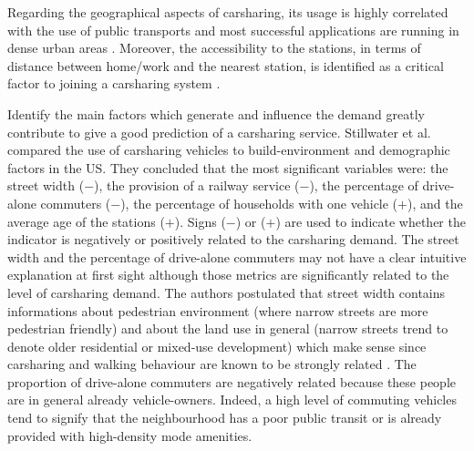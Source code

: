 \begin{bibunit}[ieeetr]
\bigskip
Regarding the geographical aspects of carsharing, its usage is highly correlated with the use of public transports and most successful applications are running in dense urban areas \cite{cervero_city_2003, millard_ball_car_sharing_2005, burkhardt_who_2006}.
Moreover, the accessibility to the stations, in terms of distance between home/work and the nearest station, is identified as a critical factor to joining a carsharing system \cite{zheng_carsharing_2009, costain_synopsis_2012, efthymiou_which_2012}.


\medskip
Identify the main factors which generate and influence the demand greatly contribute to give a good prediction of a carsharing service.
Stillwater et al. \cite{stillwater_carsharing_2009} compared the use of carsharing vehicles to build-environment and demographic factors in the US.
They concluded that the most significant variables were: the street width ($-$), the provision of a railway service ($-$), the percentage of drive-alone commuters ($-$), 
the percentage of households with one vehicle ($+$), and the average age of the stations ($+$).
Signs ($-$) or ($+$) are used to indicate whether the indicator is negatively or positively related to the carsharing demand.
The street width and the percentage of drive-alone commuters may not have a clear intuitive explanation at first sight although those metrics are significantly related to the level of carsharing demand.
The authors postulated that street width contains informations about pedestrian environment (where narrow streets are more pedestrian friendly) and about the land use in general (narrow streets trend to denote older residential or mixed-use development) which make sense since carsharing and walking behaviour are known to be strongly related \cite{cervero_city_2003}.
The proportion of drive-alone commuters are negatively related because these people are in general already vehicle-owners.
Indeed, a high level of commuting vehicles tend to signify that the neighbourhood has a poor public transit or is already provided with high-density mode amenities.



\end{bibunit}
